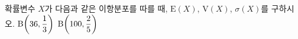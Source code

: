 확률변수 $X$가 다음과 같은 이항분포를 따를 때, $\mathrm{E}(X)$, $\mathrm{V}(X)$, $\sigma(X)$를 구하시오.
 $\mathrm{B}\!\left(36{,}\mkern3mu\mathopen{}\dfrac{1}{3}\right)$
 $\mathrm{B}\!\left(100{,}\mkern3mu\mathopen{}\dfrac{2}{5}\right)$
